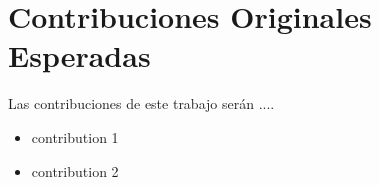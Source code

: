 \chapter{Contribuciones Originales Esperadas}
\label{chp:contribuciones}
Las contribuciones de este trabajo serán ....
\begin{itemize}
\item contribution 1
\item contribution 2
\end{itemize}
